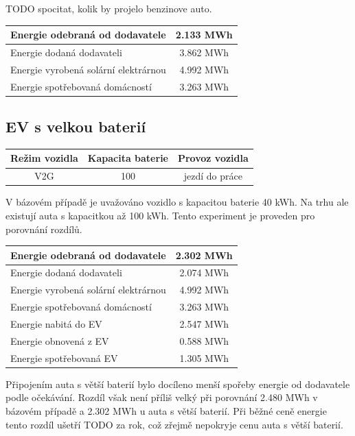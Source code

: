 \documentclass[12pt,a4paper]{article}
\begin{document}
TODO spocitat, kolik by projelo benzinove auto.

\bigskip
\begin{tabular}{ | l | c | }
\hline
Energie odebraná od dodavatele & 2.133 MWh \\
\hline
Energie dodaná dodavateli &  3.862 MWh \\
\hline
Energie vyrobená solární elektrárnou & 4.992 MWh \\
\hline
Energie spotřebovaná domácností & 3.263 MWh \\
\hline
\end{tabular}
\bigskip


\subsection{EV s velkou baterií}

\bigskip
\begin{tabular}{ | c | c | c | }
\hline
Režim vozidla & Kapacita baterie & Provoz vozidla \\
\hline
V2G & 100 & jezdí do práce \\
\hline
\end{tabular}
\bigskip

V bázovém případě je uvažováno vozidlo s kapacitou baterie 40 kWh.
Na trhu ale existují auta s kapacitkou až 100 kWh.
Tento experiment je proveden pro porovnání rozdílů.

\bigskip
\begin{tabular}{ | l | c | }
\hline
Energie odebraná od dodavatele & 2.302 MWh \\
\hline
Energie dodaná dodavateli & 2.074 MWh \\
\hline
Energie vyrobená solární elektrárnou & 4.992 MWh \\
\hline
Energie spotřebovaná domácností & 3.263 MWh \\
\hline
Energie nabitá do EV & 2.547 MWh \\
\hline
Energie obnovená z EV & 0.588 MWh \\
\hline
Energie spotřebovaná EV & 1.305 MWh \\
\hline
\end{tabular}
\bigskip

Připojením auta s větší baterií bylo docíleno menší spořeby energie od dodavatele podle očekávání.
Rozdíl však není příliš velký při porovnání 2.480 MWh v bázovém případě a
2.302 MWh u auta s větší baterií.
Při běžné ceně energie tento rozdíl ušetří TODO za rok, což zřejmě nepokryje cenu auta s větší baterií.
\end{document}
